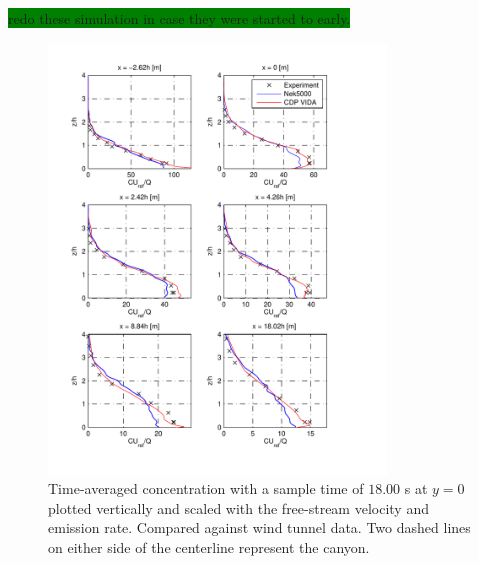 \colorbox{green}{redo these simulation in case they were started to early.}
%
\begin{figure}[h]
	\centering
	\includegraphics[width=0.8\textwidth]{Figures/NekcV.pdf}
	\caption{Time-averaged concentration with a sample time of $18.00$ s at $y = 0$ plotted
    vertically and scaled 
	with the free-stream velocity and emission rate. Compared against wind tunnel data.
Two dashed lines on either side of the centerline represent the canyon.}
	\label{fig:cVfilter}
\end{figure}
%

